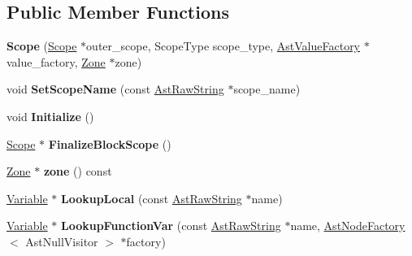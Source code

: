 \subsection*{Public Member Functions}
\begin{DoxyCompactItemize}
\item 
\hypertarget{classv8_1_1internal_1_1_scope_abf01adc6b364df212a81910b6e85f83e}{}{\bfseries Scope} (\hyperlink{classv8_1_1internal_1_1_scope}{Scope} $\ast$outer\+\_\+scope, Scope\+Type scope\+\_\+type, \hyperlink{classv8_1_1internal_1_1_ast_value_factory}{Ast\+Value\+Factory} $\ast$value\+\_\+factory, \hyperlink{classv8_1_1internal_1_1_zone}{Zone} $\ast$zone)\label{classv8_1_1internal_1_1_scope_abf01adc6b364df212a81910b6e85f83e}

\item 
\hypertarget{classv8_1_1internal_1_1_scope_ae9877078e245aeddae0da2bad198c7db}{}void {\bfseries Set\+Scope\+Name} (const \hyperlink{classv8_1_1internal_1_1_ast_raw_string}{Ast\+Raw\+String} $\ast$scope\+\_\+name)\label{classv8_1_1internal_1_1_scope_ae9877078e245aeddae0da2bad198c7db}

\item 
\hypertarget{classv8_1_1internal_1_1_scope_a7ff6df027b40c8976b5097c513415ebb}{}void {\bfseries Initialize} ()\label{classv8_1_1internal_1_1_scope_a7ff6df027b40c8976b5097c513415ebb}

\item 
\hypertarget{classv8_1_1internal_1_1_scope_ac1de3630860a2fb185db850dae9f152c}{}\hyperlink{classv8_1_1internal_1_1_scope}{Scope} $\ast$ {\bfseries Finalize\+Block\+Scope} ()\label{classv8_1_1internal_1_1_scope_ac1de3630860a2fb185db850dae9f152c}

\item 
\hypertarget{classv8_1_1internal_1_1_scope_ab5d14906e87e8abcce9837bbeb0ed416}{}\hyperlink{classv8_1_1internal_1_1_zone}{Zone} $\ast$ {\bfseries zone} () const \label{classv8_1_1internal_1_1_scope_ab5d14906e87e8abcce9837bbeb0ed416}

\item 
\hypertarget{classv8_1_1internal_1_1_scope_afcca436cb4b3d078968aebd66f5c8f4b}{}\hyperlink{classv8_1_1internal_1_1_variable}{Variable} $\ast$ {\bfseries Lookup\+Local} (const \hyperlink{classv8_1_1internal_1_1_ast_raw_string}{Ast\+Raw\+String} $\ast$name)\label{classv8_1_1internal_1_1_scope_afcca436cb4b3d078968aebd66f5c8f4b}

\item 
\hypertarget{classv8_1_1internal_1_1_scope_a1b139eaa250db3092bc054a3c0a65c76}{}\hyperlink{classv8_1_1internal_1_1_variable}{Variable} $\ast$ {\bfseries Lookup\+Function\+Var} (const \hyperlink{classv8_1_1internal_1_1_ast_raw_string}{Ast\+Raw\+String} $\ast$name, \hyperlink{classv8_1_1internal_1_1_ast_node_factory}{Ast\+Node\+Factory}$<$ Ast\+Null\+Visitor $>$ $\ast$factory)\label{classv8_1_1internal_1_1_scope_a1b139eaa250db3092bc054a3c0a65c76}


\end{DoxyCompactItemize}
